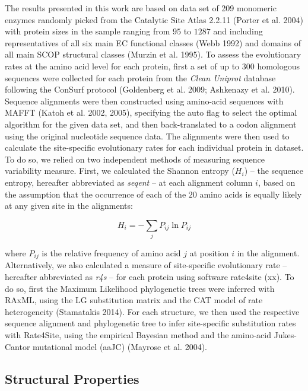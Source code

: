\documentclass[11pt]{article}
\begin{document}
    The results presented in this work are based on data set of 209 monomeric enzymes randomly picked from the Catalytic Site Atlas 2.2.11 (Porter et al. 2004) with protein sizes in the sample ranging from $95$ to $1287$ and including representatives of all six main EC functional classes (Webb 1992) and domains of all main SCOP structural classes (Murzin et al. 1995). To assess the evolutionary rates at the amino acid level for each protein, first a set of up to $300$ homologous sequences were collected for each protein from the {\it Clean Uniprot} database following the ConSurf protocol (Goldenberg et al. 2009; Ashkenazy et al. 2010). Sequence alignments were then constructed using amino-acid sequences with MAFFT (Katoh et al. 2002, 2005), specifying the auto flag to select the optimal algorithm for the given data set, and then back-translated to a codon alignment using the original nucleotide sequence data. The alignments were then used to calculate the site-specific evolutionary rates for each individual protein in dataset. To do so, we relied on two independent methods of measuring sequence variability measure. First, we calculated the Shannon entropy ($H_i$) -- the sequence entropy, hereafter abbreviated as {\it seqent} -- at each alignment column $i$, based on the assumption that the occurrence of each of the $20$ amino acids is equally likely at any given site in the alignments:

    \begin{equation}
        \label{eqn:shannon}
        H_i = -\sum_j P_{ij}\ln P_{ij}
    \end{equation}

    where $P_{ij}$ is the relative frequency of amino acid $j$ at position $i$ in the alignment. Alternatively, we also calculated a measure of site-specific evolutionary rate -- hereafter abbreviated as {\it r4s} -- for each protein using software rate4site (xx). To do so, first the Maximum Likelihood phylogenetic trees were inferred with RAxML, using the LG substitution matrix and the CAT model of rate heterogeneity (Stamatakis 2014). For each structure, we then used the respective sequence alignment and phylogenetic tree to infer site-specific substitution rates with Rate4Site, using the empirical Bayesian method and the amino-acid Jukes-Cantor mutational model (aaJC) (Mayrose et al. 2004).

    \subsection*{Structural Properties}
\end{document}
